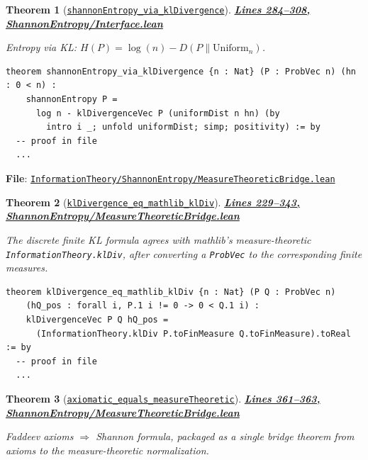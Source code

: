 \documentclass[11pt]{article}
\newtheorem{theorem}{Theorem}[section]
\theoremstyle{definition}
\theoremstyle{remark}
\begin{document}
\begin{theorem}[\href{https://github.com/zariuq/ks-foundations-of-inference/blob/main/InformationTheory/ShannonEntropy/Interface.lean\#L285}{\texttt{shannonEntropy\_via\_klDivergence}}]
\textbf{\href{https://github.com/zariuq/ks-foundations-of-inference/blob/main/InformationTheory/ShannonEntropy/Interface.lean\#L284-L308}{Lines 284--308, ShannonEntropy/Interface.lean}}

Entropy via KL: $H(P) = \log(n) - D(P \| \mathrm{Uniform}_n)$.
\end{theorem}

\begin{lstlisting}[caption={Entropy via KL (finite)}]
theorem shannonEntropy_via_klDivergence {n : Nat} (P : ProbVec n) (hn : 0 < n) :
    shannonEntropy P =
      log n - klDivergenceVec P (uniformDist n hn) (by
        intro i _; unfold uniformDist; simp; positivity) := by
  -- proof in file
  ...
\end{lstlisting}

\textbf{File}: \href{https://github.com/zariuq/ks-foundations-of-inference/blob/main/InformationTheory/ShannonEntropy/MeasureTheoreticBridge.lean}{\texttt{InformationTheory/ShannonEntropy/MeasureTheoreticBridge.lean}}

\begin{theorem}[\href{https://github.com/zariuq/ks-foundations-of-inference/blob/main/InformationTheory/ShannonEntropy/MeasureTheoreticBridge.lean\#L236}{\texttt{klDivergence\_eq\_mathlib\_klDiv}}]
\textbf{\href{https://github.com/zariuq/ks-foundations-of-inference/blob/main/InformationTheory/ShannonEntropy/MeasureTheoreticBridge.lean\#L229-L343}{Lines 229--343, ShannonEntropy/MeasureTheoreticBridge.lean}}

The discrete finite KL formula agrees with mathlib's measure-theoretic \texttt{InformationTheory.klDiv},
after converting a \texttt{ProbVec} to the corresponding finite measures.
\end{theorem}

\begin{lstlisting}[caption={Discrete KL equals mathlib klDiv (finite case)}]
theorem klDivergence_eq_mathlib_klDiv {n : Nat} (P Q : ProbVec n)
    (hQ_pos : forall i, P.1 i != 0 -> 0 < Q.1 i) :
    klDivergenceVec P Q hQ_pos =
      (InformationTheory.klDiv P.toFinMeasure Q.toFinMeasure).toReal := by
  -- proof in file
  ...
\end{lstlisting}

\begin{theorem}[\href{https://github.com/zariuq/ks-foundations-of-inference/blob/main/InformationTheory/ShannonEntropy/MeasureTheoreticBridge.lean\#L361}{\texttt{axiomatic\_equals\_measureTheoretic}}]
\textbf{\href{https://github.com/zariuq/ks-foundations-of-inference/blob/main/InformationTheory/ShannonEntropy/MeasureTheoreticBridge.lean\#L361-L363}{Lines 361--363, ShannonEntropy/MeasureTheoreticBridge.lean}}

Faddeev axioms $\Rightarrow$ Shannon formula, packaged as a single bridge theorem from axioms to the
measure-theoretic normalization.
\end{theorem}
\end{document}
